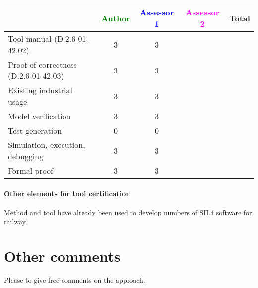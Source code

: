 \begin{tabular}{|l | c | c | c | c|}
\hline
& \textcolor{green}{Author} & \textcolor{blue}{Assessor 1} & \textcolor{magenta}{Assessor 2} & Total \\
\hline 
Tool manual (D.2.6-01-42.02) & 3 & 3 & &  \\
\hline
Proof of correctness (D.2.6-01-42.03)   & 3 & 3 & & \\
\hline
Existing industrial  usage  & 3  & 3 & & \\
\hline
Model verification & 3 & 3 & & \\
\hline
Test generation & 0 & 0 & & \\
\hline
Simulation, execution, debugging & 3 & 3 & & \\
\hline
Formal proof & 3 & 3 & & \\
\hline
\end{tabular}

\paragraph{Other elements for tool certification}


\begin{author_comment}
Method and tool have already been used to  develop numbers of  SIL4 software for railway.
\end{author_comment}


\section{Other comments}
Please to  give free comments on the approach.



